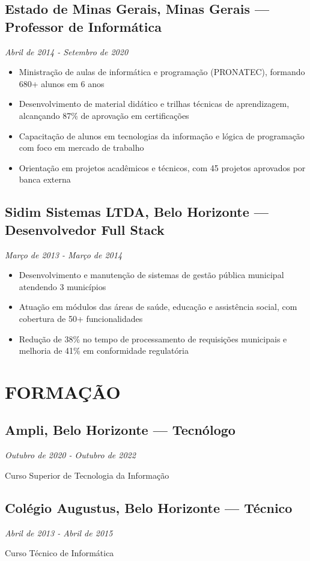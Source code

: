 \documentclass[11pt,a4paper]{article}
\newcommand{\experiencia}[4]{
    \subsection{#1, #2 — #3}
    \textit{#4}
    \vspace{4pt}
}
\newcommand{\formacao}[4]{
    \subsection{#1, #2 — #3}
    \textit{#4}
    \vspace{4pt}
}
\begin{document}
\vspace{8pt}

\experiencia{Estado de Minas Gerais}{Minas Gerais}{Professor de Informática}{Abril de 2014 - Setembro de 2020}
\begin{itemize}[leftmargin=20pt, topsep=0pt, itemsep=2pt]
    \item Ministração de aulas de informática e programação (PRONATEC), formando 680+ alunos em 6 anos
    \item Desenvolvimento de material didático e trilhas técnicas de aprendizagem, alcançando 87\% de aprovação em certificações
    \item Capacitação de alunos em tecnologias da informação e lógica de programação com foco em mercado de trabalho
    \item Orientação em projetos acadêmicos e técnicos, com 45 projetos aprovados por banca externa
\end{itemize}

\vspace{8pt}

\experiencia{Sidim Sistemas LTDA}{Belo Horizonte}{Desenvolvedor Full Stack}{Março de 2013 - Março de 2014}
\begin{itemize}[leftmargin=20pt, topsep=0pt, itemsep=2pt]
    \item Desenvolvimento e manutenção de sistemas de gestão pública municipal atendendo 3 municípios
    \item Atuação em módulos das áreas de saúde, educação e assistência social, com cobertura de 50+ funcionalidades
    \item Redução de 38\% no tempo de processamento de requisições municipais e melhoria de 41\% em conformidade regulatória
\end{itemize}

\vspace{15pt}

\section{FORMAÇÃO}

\formacao{Ampli}{Belo Horizonte}{Tecnólogo}{Outubro de 2020 - Outubro de 2022}
Curso Superior de Tecnologia da Informação

\vspace{8pt}

\formacao{Colégio Augustus}{Belo Horizonte}{Técnico}{Abril de 2013 - Abril de 2015}
Curso Técnico de Informática
\end{document}

